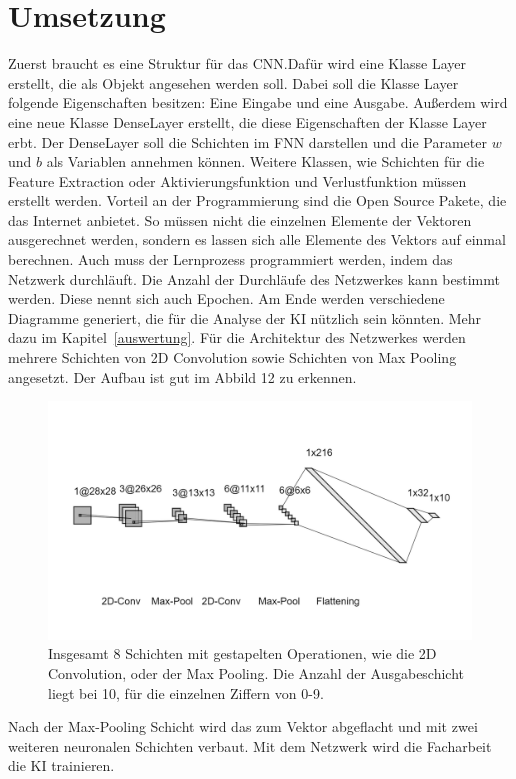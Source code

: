 \documentclass[11pt]{article}
\begin{document}
\section{Umsetzung}
Zuerst braucht es eine Struktur für das CNN.\@ Dafür wird eine Klasse Layer erstellt, die als Objekt angesehen werden soll. Dabei soll die Klasse Layer folgende
Eigenschaften besitzen: Eine Eingabe und eine Ausgabe. Außerdem wird eine neue Klasse DenseLayer erstellt, die diese Eigenschaften der Klasse Layer erbt.
Der DenseLayer soll die Schichten im FNN darstellen und die Parameter $w$ und $b$ als Variablen annehmen können. Weitere Klassen, wie Schichten für die
Feature Extraction oder Aktivierungsfunktion und Verlustfunktion müssen erstellt werden. Vorteil an der Programmierung sind die Open Source Pakete, die das
Internet anbietet. So müssen nicht die einzelnen Elemente der Vektoren ausgerechnet werden, sondern es lassen sich alle Elemente des Vektors auf einmal berechnen.
Auch muss der Lernprozess programmiert werden, indem das Netzwerk durchläuft. Die Anzahl der Durchläufe des Netzwerkes kann bestimmt werden.
Diese nennt sich auch Epochen. Am Ende werden verschiedene Diagramme generiert, die für die Analyse der KI nützlich sein könnten.
Mehr dazu im Kapitel~\ref{auswertung}. Für die Architektur des Netzwerkes werden mehrere Schichten von 2D Convolution sowie Schichten von Max Pooling angesetzt.
Der Aufbau ist gut im Abbild 12 zu erkennen.
\begin{figure}[h]
    \centering
    \includegraphics[width=400pt, keepaspectratio]{images/cnn}
    \caption[Architektur eines CNNs]{Insgesamt 8 Schichten mit gestapelten Operationen, wie die 2D Convolution, oder der Max Pooling.
    Die Anzahl der Ausgabeschicht liegt bei 10, für die einzelnen Ziffern von 0-9.}
\end{figure}
Nach der Max-Pooling Schicht wird das zum Vektor abgeflacht und mit zwei weiteren neuronalen Schichten verbaut.
Mit dem Netzwerk wird die Facharbeit die KI trainieren.
\end{document}
